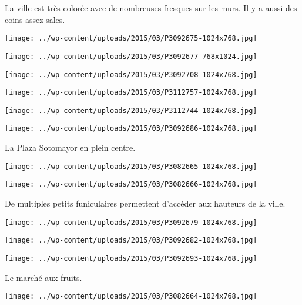La ville est très colorée avec de nombreuses fresques sur les murs. Il y a aussi des coins assez sales.
\begin{center} \texttt{[image: ../wp-content/uploads/2015/03/P3092675-1024x768.jpg]} \end{center}
\begin{center} \texttt{[image: ../wp-content/uploads/2015/03/P3092677-768x1024.jpg]} \end{center}
\begin{center} \texttt{[image: ../wp-content/uploads/2015/03/P3092708-1024x768.jpg]} \end{center}
\begin{center} \texttt{[image: ../wp-content/uploads/2015/03/P3112757-1024x768.jpg]} \end{center}
\begin{center} \texttt{[image: ../wp-content/uploads/2015/03/P3112744-1024x768.jpg]} \end{center}
\begin{center} \texttt{[image: ../wp-content/uploads/2015/03/P3092686-1024x768.jpg]} \end{center}

\pagebreak
 La Plaza Sotomayor en plein centre.
\begin{center} \texttt{[image: ../wp-content/uploads/2015/03/P3082665-1024x768.jpg]} \end{center}
\begin{center} \texttt{[image: ../wp-content/uploads/2015/03/P3082666-1024x768.jpg]} \end{center}

\pagebreak
 De multiples petits funiculaires permettent d'accéder aux hauteurs de la ville.
\begin{center} \texttt{[image: ../wp-content/uploads/2015/03/P3092679-1024x768.jpg]} \end{center}
\begin{center} \texttt{[image: ../wp-content/uploads/2015/03/P3092682-1024x768.jpg]} \end{center}
\begin{center} \texttt{[image: ../wp-content/uploads/2015/03/P3092693-1024x768.jpg]} \end{center}

Le marché aux fruits.
\begin{center} \texttt{[image: ../wp-content/uploads/2015/03/P3082664-1024x768.jpg]} \end{center}


